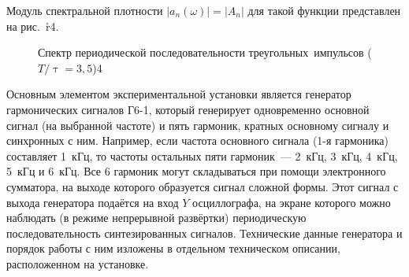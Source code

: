 Модуль спектральной плотности $|a_n(\omega)|=|A_n|$ для такой функции представлен на рис.~\r{r4}.

\begin{figure}[!t]%
\noindent
\hfill{}
\hfill{}
{\cct Спектр периодической последовательности треугольных~импульсов ($T/\uptau=3,5$)}{4}
\hfill
\uvcs
\end{figure}%

\eo Основным элементом экспериментальной установки является генератор гармонических сигналов Г6-1, который генерирует
одновременно основной сигнал (на выбранной частоте) и пять гармоник, кратных основному сигналу и синхронных с ним.
Например, если частота основного сигнала (1-я гармоника) составляет 1~кГц, то частоты остальных пяти гармоник~--- 2~кГц,
3~кГц, 4~кГц, 5~кГц и 6~кГц. Все 6 гармоник могут складываться при помощи электронного сумматора, на выходе которого
образуется сигнал сложной формы. Этот сигнал с выхода генератора подаётся на вход $Y$ осциллографа, на экране которого
можно наблюдать (в режиме непрерывной развёртки) периодическую последовательность синтезированных сигналов. Технические
данные генератора и порядок работы с ним изложены в отдельном техническом описании, расположенном на установке.

